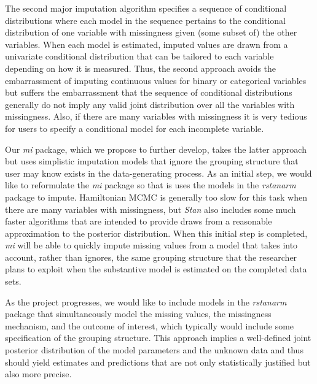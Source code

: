 \documentclass[11pt,notitlepage]{article}
\begin{document}
The second major imputation algorithm specifies a sequence of conditional distributions
where each model in the sequence pertains to the conditional distribution of one variable with
missingness given (some subset of) the other variables. When each model is estimated, imputed
values are drawn from a univariate conditional distribution that can be tailored to each 
variable depending on how it is measured. Thus, the second approach avoids the embarrassment
of imputing continuous values for binary or categorical variables but suffers the embarrassment
that the sequence of conditional distributions generally do not imply any valid joint 
distribution over all the variables with missingness. Also, if there are many variables with
missingness it is very tedious for users to specify a conditional model for each incomplete
variable.

Our \textit{mi} package, which we propose to further develop, takes the latter approach but uses simplistic imputation models that 
ignore the grouping structure that user may know exists in the data-generating process. As
an initial step, we would like to reformulate the \textit{mi} package so that is uses the
models in the \textit{rstanarm} package to impute. Hamiltonian MCMC is generally too slow
for this task when there are many variables with missingness, but \textit{Stan} also includes
some much faster algorithms that are intended to provide draws from a reasonable approximation
to the posterior distribution. When this initial step is completed, \textit{mi} will be able
to quickly impute missing values from a model that takes into account, rather than ignores,
the same grouping structure that the researcher plans to exploit when the substantive model
is estimated on the completed data sets.

As the project progresses, we would like to include models in the \textit{rstanarm} package that
simultaneously model the missing values, the missingness mechanism, and the outcome of 
interest, which typically would include some specification of the grouping structure. This
approach implies a well-defined joint posterior distribution of the model parameters and 
the unknown data and thus should yield estimates and predictions that are not only statistically
justified but also more precise.
\end{document}
